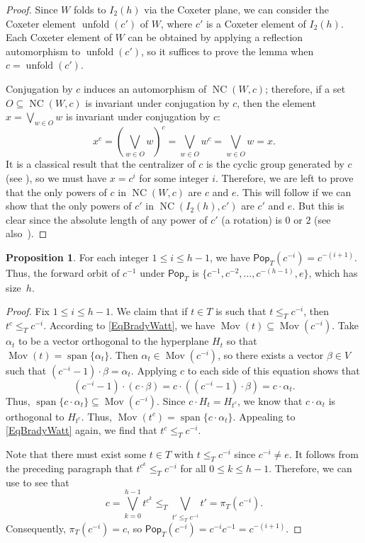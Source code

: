\documentclass[10pt,a4paper]{amsart}
\theoremstyle{definition}
\newtheorem{prop}[prop]{Proposition}
\newcommand{\pop}{\mathsf{Pop}}
\DeclareMathOperator{\spn}{span}
\DeclareMathOperator{\NC}{NC}
\DeclareMathOperator{\mov}{Mov}
\DeclareMathOperator{\unfold}{unfold}
\begin{document}
\begin{proof}
Since $W$ folds to $I_2(h)$ via the Coxeter plane, we can consider the Coxeter element $\unfold(c')$ of $W$, where $c'$ is a Coxeter element of $I_2(h)$. Each Coxeter element of $W$ can be obtained by applying a reflection automorphism to $\unfold(c')$, so it suffices to prove the lemma when $c=\unfold(c')$.

Conjugation by $c$ induces an automorphism of $\NC(W,c)$; therefore, if a set $O \subseteq \NC(W,c)$ is invariant under conjugation by $c$, then the element $x=\bigvee_{w \in O} w$ is invariant under conjugation by $c$:
	\[
x^c = \left(\bigvee_{w \in O} w\right)^c = \bigvee_{w \in O} w^c = \bigvee_{w \in O} w = x.
\]
It is a classical result that the centralizer of $c$ is the cyclic group generated by $c$ (see \cite[Proposition~30]{Carter}), so we must have $x=c^i$ for some integer $i$.  Therefore, we are left to prove that the only powers of $c$ in $\NC(W,c)$ are $c$ and $e$. This will follow if we can show that the only powers of $c'$ in $\NC(I_2(h),c')$ are $c'$ and $e$.  But this is clear since the absolute length of any power of $c'$ (a rotation) is $0$ or $2$ (see also~\cite[Lemma~12.2]{bessis2015finite}).
\end{proof}

\begin{prop}
For each integer $1\leq i\leq h-1$, we have $\pop_T(c^{-i})=c^{-(i+1)}$. Thus, the forward orbit of $c^{-1}$ under $\pop_T$ is $\{c^{-1},c^{-2},\ldots,c^{-(h-1)},e\}$, which has size~$h$.
\label{prop:forward_cinv}
\end{prop}

\begin{proof}
Fix $1\leq i\leq h-1$. We claim that if $t\in T$ is such that $t \leq_T c^{-i}$, then $t^c \leq_T c^{-i}$.  According to \eqref{EqBradyWatt}, we have $\mov(t) \subseteq \mov(c^{-i})$.  Take $\alpha_t$ to be a vector orthogonal to the hyperplane $H_t$ so that $\mov(t) = \spn\{\alpha_t\}$.  Then $\alpha_t\in\mov(c^{-i})$, so there exists a vector $\beta\in V$ such that $(c^{-i}-1)\cdot\beta = \alpha_t$. Applying $c$ to each side of this equation shows that 
\[
(c^{-i}-1)\cdot(c\cdot\beta)=c\cdot((c^{-i}-1)\cdot\beta)=c\cdot\alpha_t.
\]
 Thus, $\spn\{c\cdot\alpha_t\}\subseteq\mov(c^{-i})$. Since $c\cdot H_t=H_{t^c}$, we know that $c\cdot\alpha_t$ is orthogonal to $H_{t^c}$. Thus, $\mov(t^c)=\spn\{c\cdot\alpha_t\}$. Appealing to \eqref{EqBradyWatt} again, we find that $t^c\leq_T c^{-i}$. 

Note that there must exist some $t\in T$ with $t \leq_T c^{-i}$ since $c^{-i} \neq e$. It follows from the preceding paragraph that $t^{c^k}\leq_T c^{-i}$ for all $0\leq k\leq h-1$. Therefore, we can use  to see that 
\[
c=\bigvee\limits_{k=0}^{h-1} t^{c^{k}}\leq_T\bigvee_{t'\leq_T c^{-i}}t'=\pi_T(c^{-i}).
\]
 Consequently, $\pi_T(c^{-i})=c$, so $\pop_T(c^{-i})=c^{-i}c^{-1}=c^{-(i+1)}$. 
\end{proof}
\end{document}
